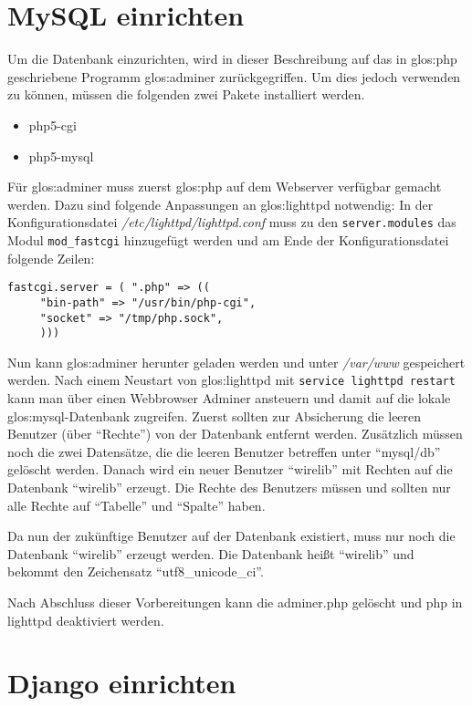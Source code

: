 \section{MySQL einrichten}
Um die Datenbank einzurichten, wird in dieser Beschreibung auf das in
\Gls{glos:php} geschriebene Programm \Gls{glos:adminer} zurückgegriffen.
Um dies jedoch verwenden zu können, müssen die folgenden zwei Pakete installiert
werden.

\begin{itemize}
  \item php5-cgi
  \item php5-mysql
\end{itemize}

Für \Gls{glos:adminer} muss zuerst \Gls{glos:php} auf dem Webserver verfügbar
gemacht werden. Dazu sind folgende Anpassungen an \Gls{glos:lighttpd}
notwendig:
In der Konfigurationsdatei \emph{/etc/lighttpd/lighttpd.conf} muss zu den
\lstinline{server.modules} das Modul \lstinline{mod_fastcgi} hinzugefügt
werden und am Ende der Konfigurationsdatei folgende Zeilen:

\begin{lstlisting}
fastcgi.server = ( ".php" => (( 
     "bin-path" => "/usr/bin/php-cgi",
     "socket" => "/tmp/php.sock",
     )))
\end{lstlisting}

Nun kann \Gls{glos:adminer} herunter geladen werden und unter \emph{/var/www}
gespeichert werden. Nach einem Neustart von \Gls{glos:lighttpd} mit
\lstinline{service lighttpd restart} kann man über einen Webbrowser Adminer
ansteuern und damit auf die lokale \Gls{glos:mysql}-Datenbank zugreifen. Zuerst
sollten zur Absicherung die leeren Benutzer (über "`Rechte"') von der Datenbank
entfernt werden. Zusätzlich müssen noch die zwei Datensätze, die die leeren
Benutzer betreffen unter "`mysql/db"' gelöscht werden.  Danach wird ein neuer
Benutzer "`wirelib"' mit Rechten auf die Datenbank "`wirelib"' erzeugt. Die
Rechte des Benutzers müssen und sollten nur alle Rechte auf "`Tabelle"' und "`Spalte"'
haben.

Da nun der zukünftige Benutzer auf der Datenbank existiert, muss nur noch die
Datenbank "`wirelib"' erzeugt werden. Die Datenbank heißt "`wirelib"' und
bekommt den Zeichensatz "`utf8\_unicode\_ci"'.

Nach Abschluss dieser Vorbereitungen kann die adminer.php gelöscht und php in
lighttpd deaktiviert werden.

\section{Django einrichten}

